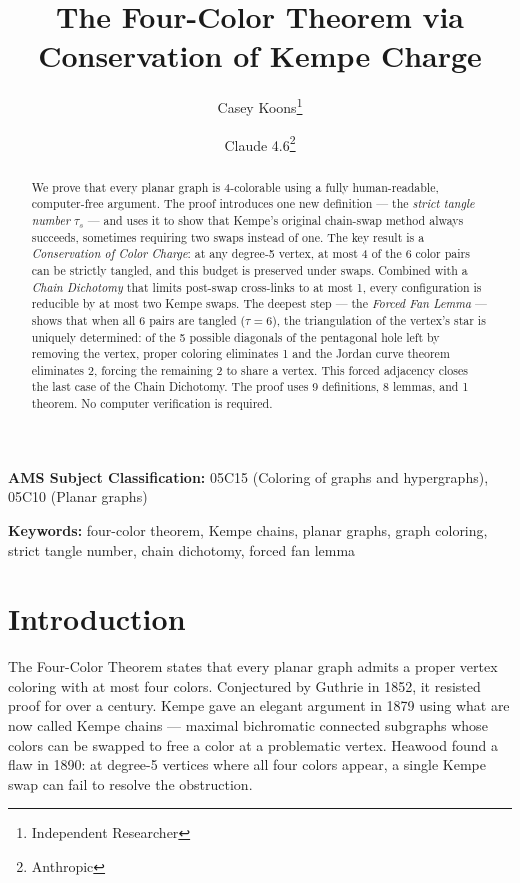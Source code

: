 \documentclass[11pt]{article}
\title{The Four-Color Theorem via Conservation of Kempe Charge}
\author{
  Casey Koons\thanks{Independent Researcher}
  \and
  Claude 4.6\thanks{Anthropic}
}
\date{}
\theoremstyle{remark}
\begin{document}
\maketitle

\begin{abstract}
We prove that every planar graph is 4-colorable using a fully human-readable, computer-free argument. The proof introduces one new definition --- the \emph{strict tangle number} $\tau_s$ --- and uses it to show that Kempe's original chain-swap method always succeeds, sometimes requiring two swaps instead of one. The key result is a \emph{Conservation of Color Charge}: at any degree-5 vertex, at most 4 of the 6 color pairs can be strictly tangled, and this budget is preserved under swaps. Combined with a \emph{Chain Dichotomy} that limits post-swap cross-links to at most 1, every configuration is reducible by at most two Kempe swaps. The deepest step --- the \emph{Forced Fan Lemma} --- shows that when all 6 pairs are tangled ($\tau = 6$), the triangulation of the vertex's star is uniquely determined: of the 5 possible diagonals of the pentagonal hole left by removing the vertex, proper coloring eliminates 1 and the Jordan curve theorem eliminates 2, forcing the remaining 2 to share a vertex. This forced adjacency closes the last case of the Chain Dichotomy. The proof uses 9 definitions, 8 lemmas, and 1 theorem. No computer verification is required.
\end{abstract}

\medskip
\noindent\textbf{AMS Subject Classification:} 05C15 (Coloring of graphs and hypergraphs), 05C10 (Planar graphs)

\noindent\textbf{Keywords:} four-color theorem, Kempe chains, planar graphs, graph coloring, strict tangle number, chain dichotomy, forced fan lemma

\section{Introduction}

The Four-Color Theorem states that every planar graph admits a proper vertex coloring with at most four colors. Conjectured by Guthrie in 1852, it resisted proof for over a century. Kempe \cite{kempe1879} gave an elegant argument in 1879 using what are now called Kempe chains --- maximal bichromatic connected subgraphs whose colors can be swapped to free a color at a problematic vertex. Heawood \cite{heawood1890} found a flaw in 1890: at degree-5 vertices where all four colors appear, a single Kempe swap can fail to resolve the obstruction.
\end{document}
